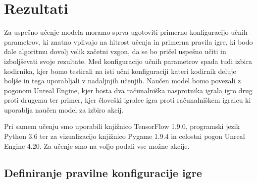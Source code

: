 \documentclass[a4paper, 12pt]{book}
\begin{document}

\chapter{Rezultati}
\label{chrezultati}

Za uspešno učenje modela moramo sprva ugotoviti primerno konfiguracijo učnih parametrov, ki znatno vplivajo na hitrost učenja in primerna pravila igre, ki bodo dale algoritmu dovolj velik začetni vzgon, da se bo pričel uspešno učiti in izboljševati svoje rezultate.
Med konfiguracijo učnih parametrov spada tudi izbira kodirnika, kjer bomo testirali na isti učni konfiguraciji kateri kodirnik deluje boljše in tega uporabljali v nadaljnjih učenjih.
Naučen model bomo povezali z pogonom Unreal Engine, kjer bosta dva računalniška nasprotnika igrala igro drug proti drugemu ter primer, kjer človeški igralec igra proti računalniškem igralcu ki uporablja naučen model za izbiro akcij.

Pri samem učenju smo uporabili knjižnico TensorFlow 1.9.0, programski jezik Python 3.6 ter za vizualizacijo knjižnico Pygame 1.9.4 in celostni pogon Unreal Engine 4.20.
Za učenje smo na voljo podali vse možne akcije.
\section{Definiranje pravilne konfiguracije igre}
\end{document}
